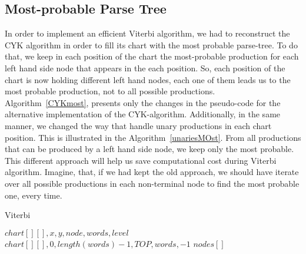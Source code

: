 \documentclass[a4paper,11pt]{article}
\begin{document}
\subsection{Most-probable Parse Tree}
In order to implement an efficient Viterbi algorithm, we had to reconstruct the CYK algorithm in order to fill its chart with the most probable parse-tree. To do that, we keep in each position of the chart the most-probable production for each left hand side node that appears in the each position. So, each position of the chart is now holding different left hand nodes, each one of them leads us to the most probable production, not to all possible productions. Algorithm~\ref{CYKmost}, presents only the changes in the pseudo-code for the alternative implementation of the CYK-algorithm. Additionally, in the same manner, we changed the way that handle unary productions in each chart position. This is illustrated in the Algorithm~\ref{unariesMOst}. From all productions that can be produced by a left hand side node, we keep only the most probable. This different approach will help us save computational cost during Viterbi algorithm. Imagine, that, if we had kept the old approach, we should have iterate over all possible productions in each non-terminal node to find the most probable one, every time.


\begin{algorithm}[t!]
\caption{Viterbi}
\label{viterbi}
\begin{small}
\begin{algorithmic}[1]
$chart[][],x,y,node,words,level$
$chart[][],0,length(words)-1,TOP,words,-1$
 $nodes[]$
\ELSE
{}
\ELSE
{}
\ENDIF
\ENDIF
{}
\ENDIF
{}
\RETURN
\ELSE
{}
\RETURN
\ENDIF
\ELSE
\RETURN
\ENDIF
\end{algorithmic}
\end{small}
\end{algorithm}
\end{document}
